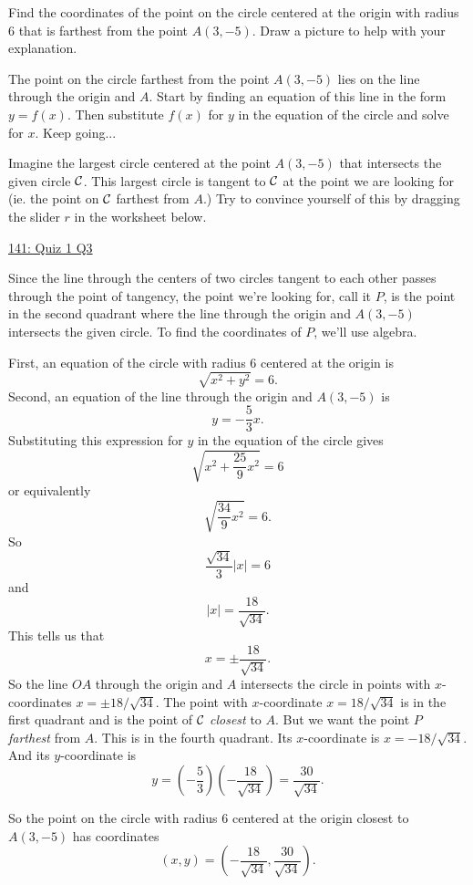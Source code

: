 \documentclass{ximera}
\begin{document}
\begin{question}  \label{Q:df454tt4443}
Find the coordinates of the point on the circle centered at the origin with radius $6$ that is farthest from the point $A(3,-5)$. Draw a picture to help with your explanation.

\begin{hint}
The point on the circle farthest from the point $A(3,-5)$ lies on the line through the origin and $A$. Start by finding an equation of this line in the form $y=f(x)$. Then substitute $f(x)$ for $y$ in the equation of the circle and solve for $x$. Keep going...
\end{hint}

\begin{explanation}

Imagine the largest circle centered at the point $A(3,-5)$ that intersects the given circle ${\cal C}$. This largest circle is tangent to ${\cal C}$ at the point we are looking for (ie. the point on ${\cal C}$ farthest from $A$.) Try to convince yourself of this by dragging the slider $r$ in the worksheet below.  
\begin{onlineOnly}
    \begin{center}
\end{center}
\end{onlineOnly}

\href{https://www.desmos.com/calculator/wwqosobejf}{141: Quiz 1 Q3}

Since the line through the centers of two circles tangent to each other passes through the point of tangency, the point we're looking for, call it $P$, is the point in the second quadrant where the line through the origin and $A(3,-5)$ intersects the given circle. To find the coordinates of $P$, we'll use algebra.

First, an equation of the circle with radius $6$ centered at the origin is
\[
     \sqrt{x^2 + y^2} = 6.
\] 
Second, an equation of the line through the origin and $A(3,-5)$ is
\[
     y = -\frac{5}{3}x .
\]
Substituting this expression for $y$ in the equation of the circle gives
\[
  \sqrt{x^2 + \frac{25}{9}x^2} = 6 
\]
or equivalently
\[
      \sqrt{\frac{34}{9}x^2} = 6 .
\]
So
\[
       \frac{\sqrt{34}}{3}|x| = 6
\]
and
\[
     | x | = \frac{18}{\sqrt{34}} .
\]
This tells us that 
\[
     x = \pm \frac{18}{\sqrt{34}} .
\]
So the line $OA$ through the origin and $A$ intersects the circle in points with $x$-coordinates $x=\pm 18/\sqrt{34}$.  The point with $x$-coordinate $x=18/\sqrt{34}$ is in the first quadrant and is the point of ${\cal C}$ \emph{closest} to $A$. But we want the point $P$ \emph{farthest} from $A$. This is in the fourth quadrant. Its $x$-coordinate is $x = -18/\sqrt{34}$. And its $y$-coordinate is
\[
    y = \left( -\frac{5}{3} \right) \left(-  \frac{18}{\sqrt{34}}  \right) = \frac{30}{\sqrt{34}}.
\]

So the point on the circle with radius $6$ centered at the origin closest to $A(3,-5)$ has coordinates
\[
   (x,y) = \left(  - \frac{18}{\sqrt{34}} ,  \frac{30}{\sqrt{34}}         \right).
\]

\end{explanation}

\end{question}
\end{document}

